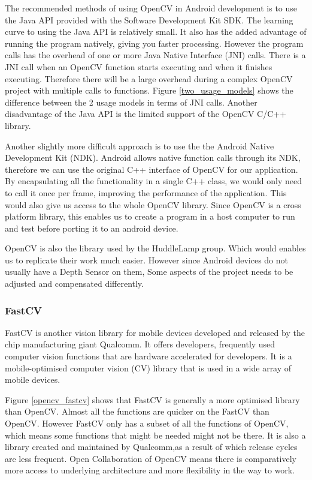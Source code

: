 The recommended methods of using OpenCV in Android development is to use the Java API provided with the Software Development Kit SDK\cite{opencv_usage_model}. The learning curve to using the Java API is relatively small. It also has the added advantage of running the program natively, giving you faster processing. However the program calls has the overhead of  one or more Java Native Interface (JNI) calls. There is a JNI call when an OpenCV function starts executing and when it finishes executing. Therefore there will be a large overhead during a complex OpenCV project with multiple calls to functions. Figure \ref{two_usage_models} shows the difference between the 2 usage models in terms of JNI calls. Another disadvantage of the Java API is the limited support of the OpenCV C/C++ library. 

Another slightly more difficult approach is to use the the Android Native Development Kit (NDK). Android allows native function calls through its NDK, therefore we can use the original C++ interface of OpenCV for our application. By encapsulating all the functionality in a single C++ class, we would only need to call it once per frame, improving the performance of the application. This would also give us access to the whole OpenCV library. Since OpenCV is a cross platform library, this enables us to create a program in a host computer to run and test before porting it to an android device.

OpenCV is also the library used by the HuddleLamp group. Which would enables us to replicate their work much easier. However since Android devices do not usually have a Depth Sensor on them, Some aspects of the project needs to be adjusted and compensated differently.

\subsubsection{FastCV}
FastCV is another vision library for mobile devices developed and released by the chip manufacturing giant Qualcomm\cite{fastcv}. It offers developers, frequently used computer vision functions that are hardware accelerated for developers. It is a mobile-optimised computer vision (CV) library that is used in a wide array of mobile devices.

Figure \ref{opencv_fastcv} shows that FastCV is generally a more optimised library than OpenCV. Almost all the functions are quicker on the FastCV than OpenCV. However FastCV only has a subset of all the functions of OpenCV, which means some functions that might be needed might not be there. It is also a library created and maintained by Qualcomm,as a result of which release cycles are less frequent. Open Collaboration of OpenCV means there is comparatively more access to underlying architecture and more flexibility in the way to work. 

